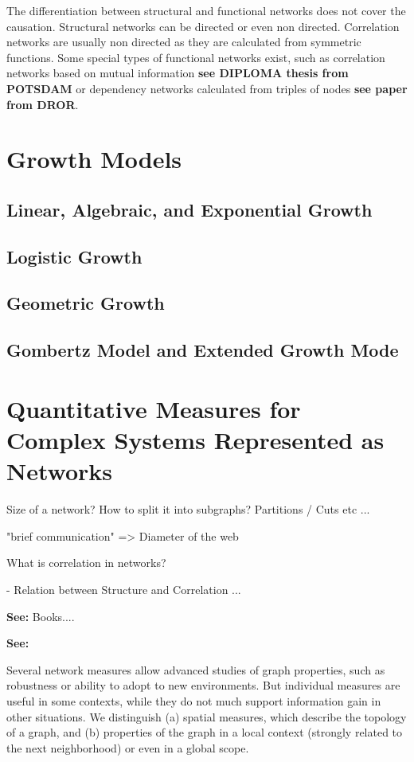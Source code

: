 \documentclass[a4paper,10pt]{scrbook}
\begin{document}
The differentiation between structural and functional networks does not cover the causation. Structural networks can be directed or even non directed. Correlation networks are usually non directed as they are calculated from symmetric functions. Some special types of functional networks exist, such as correlation networks based on mutual information \textbf{see DIPLOMA thesis from POTSDAM} or dependency networks calculated from triples of nodes \textbf{see paper from DROR}.


\section{Growth Models}
\label{sec.networkgrowth}
\subsection{Linear, Algebraic, and Exponential Growth}
\subsection{Logistic Growth}
\subsection{Geometric Growth}
\subsection{Gombertz Model and Extended Growth Mode}





\section{Quantitative Measures for Complex Systems Represented as Networks}


Size of a network? How to split it into subgraphs? Partitions / Cuts etc ...

"brief communication" => Diameter of the web





What is correlation in networks?

- Relation between Structure and Correlation ...

\textbf{See:} Books.... 

\textbf{See:} \cite{Pernice2011} 

Several network measures allow advanced studies of graph properties, such as robustness or ability to adopt to new
environments. But individual measures are useful in some contexts, while they do not much support information gain in other situations. We distinguish (a) spatial measures, which describe the topology of a graph, and (b) properties of the graph in a local context (strongly related to the next neighborhood) or even in a global scope.
\end{document}
